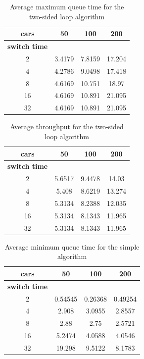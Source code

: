 \documentclass[a4paper,11pt]{article}
\begin{document}
\begin{table}[htb]
\centering
\begin{tabular}{cccc}
\hline
\textbf{cars} & 50 & 100 & 200\\
\hline
\textbf{switch time} & & & \\
2 & 3.4179 & 7.8159 & 17.204 \\
4 & 4.2786 & 9.0498 & 17.418 \\
8 & 4.6169 & 10.751 & 18.97 \\
16 & 4.6169 & 10.891 & 21.095 \\
32 & 4.6169 & 10.891 & 21.095 \\
\hline
\end{tabular}
\caption{Average maximum queue time for the two-sided loop algorithm}
\end{table}

\begin{table}[htb]
\centering
\begin{tabular}{cccc}
\hline
\textbf{cars} & 50 & 100 & 200\\
\hline
\textbf{switch time} & & & \\
2 & 5.6517 & 9.4478 & 14.03 \\
4 & 5.408 & 8.6219 & 13.274 \\
8 & 5.3134 & 8.2388 & 12.035 \\
16 & 5.3134 & 8.1343 & 11.965 \\
32 & 5.3134 & 8.1343 & 11.965 \\
\hline
\end{tabular}
\caption{Average throughput for the two-sided loop algorithm}
\end{table}

\begin{table}[htb]
\centering
\begin{tabular}{cccc}
\hline
\textbf{cars} & 50 & 100 & 200\\
\hline
\textbf{switch time} & & & \\
2 & 0.54545 & 0.26368 & 0.49254 \\
4 & 2.908 & 3.0955 & 2.8557 \\
8 & 2.88 & 2.75 & 2.5721 \\
16 & 5.2474 & 4.0588 & 4.0546 \\
32 & 19.298 & 9.5122 & 8.1783 \\
\hline
\end{tabular}
\caption{Average minimum queue time for the simple algorithm}
\end{table}
\end{document}
